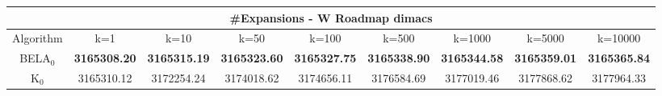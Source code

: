 \begin{tabular}{c|cccccccc}\toprule
\multicolumn{9}{c}{#Expansions - W Roadmap dimacs}\\ \midrule
Algorithm & k=1 & k=10 & k=50 & k=100 & k=500 & k=1000 & k=5000 & k=10000 \\ \midrule
BELA$_0$ & \textbf{3165308.20} & \textbf{3165315.19} & \textbf{3165323.60} & \textbf{3165327.75} & \textbf{3165338.90} & \textbf{3165344.58} & \textbf{3165359.01} & \textbf{3165365.84} \\
K$_0$ & 3165310.12 & 3172254.24 & 3174018.62 & 3174656.11 & 3176584.69 & 3177019.46 & 3177868.62 & 3177964.33 \\ \bottomrule 
\end{tabular}
